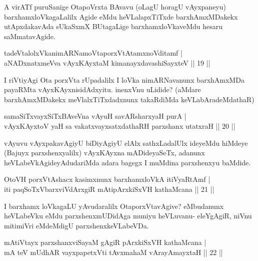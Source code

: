 \begin{artha}
A virATf puruSanige OtapoVrxta BAvavu (oLagU horagU vAyxpaneyu) barxhamxloVkagaLalilx Agide eMdu heVLalapxTiTxde barxhAmxMDakekx utApxdakavAda sUkaSxmX BUtagaLige barxhamxloVkaveMdu hesaru saMmatavAgide.
\end{artha}

\begin{shl}
tadeVtalolxVkanimARNamoVtaporxVtAtamxnoVditamf |\\
aNADxnatxmeVva vAyxKAyxtaM kimanayxdavashiSayxteV \hfill || 19 ||
\end{shl}

\begin{artha}
I riVtiyAgi Ota porxVta rUpadalilx I loVka nimARNavanunx barxhAmxMDa payaRMta vAyxKAyxnisidAdxyitu. inenxVnu uLidide? (aMdare barxhAmxMDakekx meVlalxTiTxdadxnunx takaRdiMda keVLabAradeMdathaR)
\end{artha}


\begin{shl}
samaSiTxvayxSiTxBAveVna vAyuH savARsharxyaH purA |\\
vAyxKAyxtoV yaH sa vakatxvayxsatxdathaRH parxshanx utatxraH \hfill || 20 ||
\end{shl}

\begin{artha}
vAyuvu vAyxpakavAgiyU biDiyAgiyU elAlx sathxLadalUlx ideyeMdu hiMdeye (Bajuyx parxshenxyalilx) vAyxKAyxna mADideyaSeTx, adanunx heVLabeVkAgideyAdudariMda adara bagegx I muMdina parxshenxyu baMdide.
\end{artha}

\begin{shl}
OtoVH porxVtAshacx kasimxnunx barxhamxloVkA itiVyaRtAmf |\\
iti paqSoTxV\s barxviVdArxgiR mA\s tipArxkiSxVH kathaMcana \hfill || 21 ||
\end{shl}

\begin{artha}
I barxhamx loVkagaLU yAvudaralilx OtaporxVtavAgive? eMbudanunx heVLabeVku eMdu parxshenxmUDidAga muniyu heVLuvanu- eleYgAgiR, niVnu mitimiVri eMdeMdigU parxshenxkeVLabeVDa.
\end{artha}


\begin{shl}
mA\s tiVtayx parxshanxviSayaM gAgiR pArxkiSxVH kathaMcana |\\
mA teV mUdhAR vayxpapetxVti tAvxmahaM vArayAmayxtaH \hfill || 22 ||
\end{shl}

